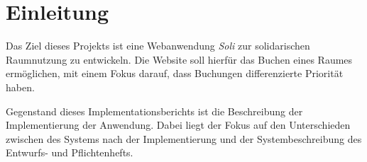 
\chapter{Einleitung}
\label{ch:preface}


Das Ziel dieses Projekts ist eine Webanwendung \textit{Soli} zur solidarischen Raumnutzung zu entwickeln.
Die Website soll hierfür das Buchen eines Raumes ermöglichen, mit einem Fokus darauf, dass Buchungen differenzierte Priorität haben.

Gegenstand dieses Implementationsberichts ist die Beschreibung der Implementierung der Anwendung.
Dabei liegt der Fokus auf den Unterschieden zwischen des Systems nach der Implementierung und der Systembeschreibung des Entwurfs- und Pflichtenhefts.
